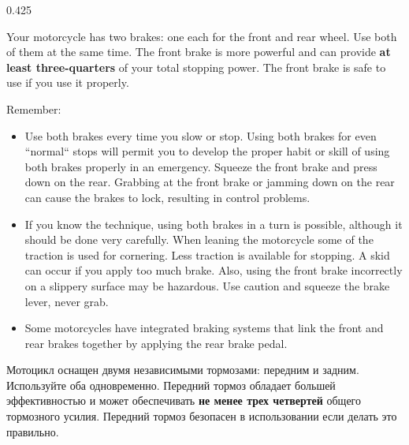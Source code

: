
\begin{langblock}{0.425}
	\begin{eng}
	Your motorcycle has two brakes: one each for the front and rear wheel. Use both of them at the same time. The front brake is more powerful and can provide \textbf{at least three-quarters} of your total stopping power. The front brake is safe to use if you use it properly.
	
	Remember:
	\begin{itemize}
		\item Use both brakes every time you slow or stop. Using both brakes for even ``normal`` stops will permit you to develop the proper habit or skill of using both brakes properly in an emergency. Squeeze the front brake and press down on the rear. Grabbing at the front brake or jamming down on the rear can cause the brakes to lock, resulting in control problems.
		\item If you know the technique, using both brakes in a turn is possible, although it should be done very carefully. When leaning the motorcycle some of the traction is used for cornering. Less traction is available for stopping. A skid can occur if you apply too much brake. Also, using the front brake incorrectly on a slippery surface may be hazardous. Use caution and squeeze the brake lever, never grab.
		\item Some motorcycles have integrated braking systems that link the front and rear brakes together by applying the rear brake pedal.
	\end{itemize}
	\end{eng}
	\begin{rus}
		Мотоцикл оснащен двумя независимыми тормозами: передним и задним. Используйте оба одновременно. Передний тормоз обладает большей эффективностью и может обеспечивать \textbf{не менее трех четвертей} общего тормозного усилия. Передний тормоз безопасен в использовании если делать это правильно.
		

\end{rus}
\end{langblock}
